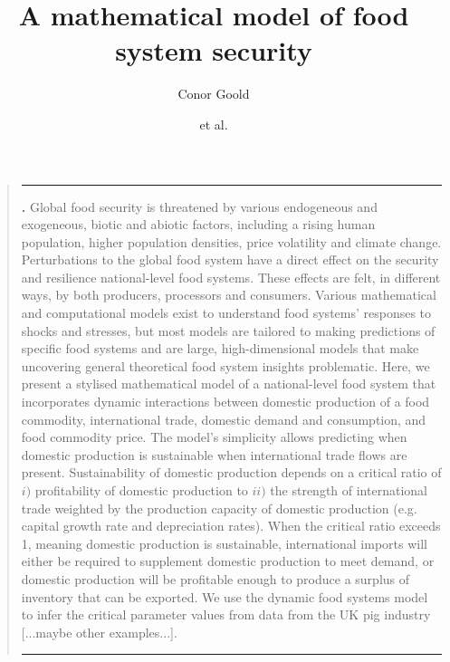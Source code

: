 \documentclass[12pt]{article}
\title{A mathematical model of food system security}
\author[1]{Conor Goold}
\affil[1]{Faculty of Biological Sciences, University of Leeds, LS2 9JT, UK}
\author{et al.}
\date{}
\renewenvironment{abstract}
{\begin{quote}
\small
\noindent \rule{\linewidth}{.5pt}\par{\bfseries \abstractname.}}
{\medskip\noindent \rule{\linewidth}{.5pt}
\end{quote}
}
\begin{document}
\linenumbers
\modulolinenumbers[5]

\maketitle
\begin{abstract}
  Global food security is threatened by various endogeneous and exogeneous, biotic and abiotic factors, including a rising human population, higher population densities, price volatility and climate change. Perturbations to the global food system have a direct effect on the security and resilience national-level food systems. These effects are felt, in different ways, by both producers, processors and consumers. Various mathematical and computational models exist to understand food systems' responses to shocks and stresses, but most models are tailored to making predictions of specific food systems and are large, high-dimensional models that make uncovering general theoretical food system insights problematic. Here, we present a stylised mathematical model of a national-level food system that incorporates dynamic interactions between domestic production of a food commodity, international trade, domestic demand and consumption, and food commodity price. The model's simplicity allows predicting when domestic production is sustainable when international trade flows are present. Sustainability of domestic production depends on a critical ratio of $i)$ profitability of domestic production to $ii)$ the strength of international trade weighted by the production capacity of domestic production (e.g. capital growth rate and depreciation rates). When the critical ratio exceeds 1, meaning domestic production is sustainable, international imports will either be required to supplement domestic production to meet demand, or domestic production will be profitable enough to produce a surplus of inventory that can be exported. We use the dynamic food systems model to infer the critical parameter values from data from the UK pig industry [...maybe other examples...].\\
\end{abstract}

\newpage
\tableofcontents
\end{document}
